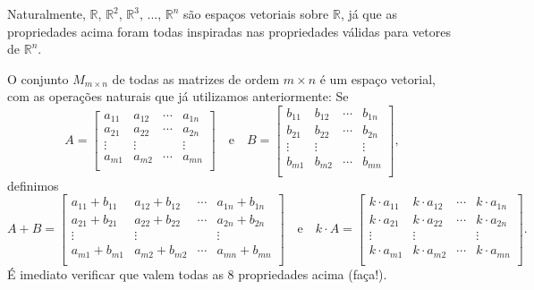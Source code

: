 \documentclass[../livro.tex]{subfiles}  %
\begin{document}
\begin{example}
	Naturalmente, $\mathbb{R}$, $\mathbb{R}^2$, $\mathbb{R}^3$, ..., $\mathbb{R}^n$ são espaços vetoriais sobre $\mathbb{R}$, já que as propriedades acima foram todas inspiradas nas propriedades válidas para vetores de $\mathbb{R}^n$.
\end{example}


\begin{example}
	O conjunto $M_{m\times n}$ de todas as matrizes de ordem $m\times n$ é um espaço vetorial, com as operações naturais que já utilizamos anteriormente: Se
	\begin{equation}
	A =
	\left[
	\begin{array}{cccc}
	a_{11} & a_{12} & \cdots & a_{1n} \\
	a_{21} & a_{22} & \cdots & a_{2n} \\
	\vdots & \vdots &        & \vdots \\
	a_{m1} & a_{m2} & \cdots & a_{mn} \\
	\end{array}
	\right] \quad \text{e} \quad
	B =
	\left[
	\begin{array}{cccc}
	b_{11} & b_{12} & \cdots & b_{1n} \\
	b_{21} & b_{22} & \cdots & b_{2n} \\
	\vdots & \vdots &        & \vdots \\
	b_{m1} & b_{m2} & \cdots & b_{mn} \\
	\end{array}
	\right],
	\end{equation} definimos
	\begin{equation}
	A + B =
	\left[
	\begin{array}{cccc}
	a_{11} + b_{11} & a_{12} + b_{12} & \cdots & a_{1n} + b_{1n} \\
	a_{21} + b_{21} & a_{22} + b_{22} & \cdots & a_{2n} + b_{2n} \\
	\vdots & \vdots &        & \vdots \\
	a_{m1} + b_{m1} & a_{m2} + b_{m2} & \cdots & a_{mn} + b_{mn} \\
	\end{array}
	\right] \quad \text{e} \quad
	k\cdot A =
	\left[
	\begin{array}{cccc}
	k\cdot a_{11} & k\cdot a_{12} & \cdots & k\cdot a_{1n} \\
	k\cdot a_{21} & k\cdot a_{22} & \cdots & k\cdot a_{2n} \\
	\vdots & \vdots &        & \vdots \\
	k\cdot a_{m1} & k\cdot a_{m2} & \cdots & k\cdot a_{mn} \\
	\end{array}
	\right].
	\end{equation} É imediato verificar que valem todas as 8 propriedades acima (faça!).
\end{example}
\end{document}
